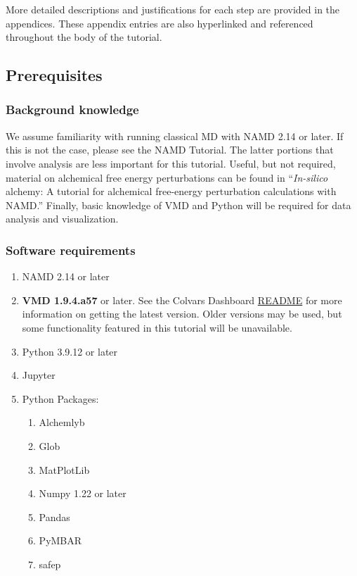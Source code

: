 \documentclass[9pt,tutorial]{Styling/livecoms}
\begin{document}
More detailed descriptions and justifications for each step are provided in the appendices. These appendix entries are also hyperlinked and referenced throughout the body of the tutorial.

\subsection{Prerequisites}
    \subsubsection{Background knowledge}\label{sec:prerequisites}
    
    We assume familiarity with running classical MD with NAMD 2.14 or later. If this is not the case, please see the NAMD Tutorial. \cite{phillips2003} The latter portions that involve analysis are less important for this tutorial. Useful, but not required, material on alchemical free energy perturbations can be found in “\textit{In-silico} alchemy: A tutorial for alchemical free-energy perturbation calculations with NAMD.” \cite{Henin2017} Finally, basic knowledge of VMD and Python will be required for data analysis and visualization.  

\subsubsection{Software requirements}\label{sec:7.2}
    \begin{enumerate}
        \item NAMD 2.14 or later
        \item \textbf{VMD 1.9.4.a57} or later. See the Colvars Dashboard \href{https://github.com/Colvars/colvars/tree/master/vmd/cv_dashboard}{README} for more information on getting the latest version. Older versions may be used, but some functionality featured in this tutorial will be unavailable.
        \item Python 3.9.12 or later
        \item Jupyter
        \item Python Packages:
        \begin{enumerate}
        \item Alchemlyb
        \item Glob
        \item MatPlotLib
        \item Numpy 1.22 or later
        \item Pandas
        \item PyMBAR
        \item safep
        \end{enumerate}
    \end{enumerate}
\end{document}
